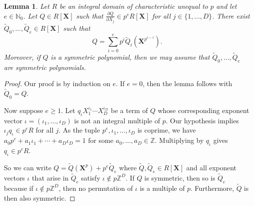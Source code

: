\documentclass[12pt,oneside,a4]{amsart}
\newcommand{\IN}{\mathbb{N}}
\newcommand{\IZ}{\mathbb{Z}}
\newcounter{maincounter}
\numberwithin{maincounter}{section}
\numberwithin{equation}{section}
\newtheorem{lemma}[maincounter]{Lemma}
\begin{document}
\begin{lemma}
  \label{lem:symmetricppower}
  Let $R$ be an integral domain of characteristic unequal to $p$ and
  let  $e\in\IN_0$. 
  Let $Q \in R[\boldsymbol X]$ such that $\frac{\partial Q}{\partial
    X_j} \in p^e R[\boldsymbol X]$ for all $j\in \{1,\ldots,D\}$.
  There exist $\tilde Q_0,\ldots,\tilde Q_e \in
  R[\boldsymbol X]$ such that
  \begin{equation}
    \label{eq:diffQpowerpconclusion}
    Q = \sum_{i=0}^e p^i \tilde Q_i(\boldsymbol{X}^{p^{e-i}}).
  \end{equation}
  Moreover, if $Q$ is a symmetric polynomial, then we may assume that
  $\tilde Q_0,\ldots,\tilde Q_e$ are symmetric polynomials. 
\end{lemma}
\begin{proof}
  Our proof is by induction on $e$.
  If $e=0$, then the lemma follows with $\tilde Q_0=Q$. 
 
  Now suppose $e\ge 1$.
  Let 
  $q_\iota X_1^{\iota_1}\cdots
  X_D^{\iota_D}$
  be a term of $Q$ whose
  corresponding
   exponent vector
  $\iota=(\iota_1,\ldots,\iota_D)$  is not an integral multiple of $p$.
  Our hypothesis implies $\iota_j q_\iota\in p^e R$ for all $j$. As the tuple
  $p^e,\iota_1,\ldots,\iota_D$ is coprime,
  we have $a_0 p^e+ a_1 \iota_1+\cdots +a_D \iota_D =1$ for some
  $a_0,\ldots,a_D\in\IZ$.
  Multiplying by $q_\iota$
  gives $q_\iota \in p^e R$.

  So we can write $Q =\tilde Q(\boldsymbol{X}^p) + p^e \tilde Q_e$
  where $\tilde Q,\tilde Q_e\in
  R[\boldsymbol X]$ and all exponent vectors $\iota$ that arise in
  $\tilde Q_e$
  satisfy $\iota\not\in p\IZ^D$.
  If $Q$ is symmetric, then so is $\tilde Q_e$
  because if $\iota\not\in p\IZ^D$, then no
  permutation of $\iota$ is a multiple of $p$. Furthermore, $\tilde Q$ is
  then also symmetric.


\end{proof}
\end{document}
